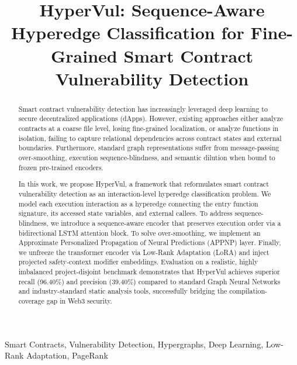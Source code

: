 \documentclass[conference]{IEEEtran}
\begin{document}
\title{HyperVul: Sequence-Aware Hyperedge Classification for Fine-Grained Smart Contract Vulnerability Detection}


\maketitle

\begin{abstract}
Smart contract vulnerability detection has increasingly leveraged deep learning to secure decentralized applications (dApps). However, existing approaches either analyze contracts at a coarse file level, losing fine-grained localization, or analyze functions in isolation, failing to capture relational dependencies across contract states and external boundaries. Furthermore, standard graph representations suffer from message-passing over-smoothing, execution sequence-blindness, and semantic dilution when bound to frozen pre-trained encoders. 

In this work, we propose HyperVul, a framework that reformulates smart contract vulnerability detection as an interaction-level hyperedge classification problem. We model each execution interaction as a hyperedge connecting the entry function signature, its accessed state variables, and external callees. To address sequence-blindness, we introduce a sequence-aware encoder that preserves execution order via a bidirectional LSTM attention block. To solve over-smoothing, we implement an Approximate Personalized Propagation of Neural Predictions (APPNP) layer. Finally, we unfreeze the transformer encoder via Low-Rank Adaptation (LoRA) and inject projected safety-context modifier embeddings. Evaluation on a realistic, highly imbalanced project-disjoint benchmark demonstrates that HyperVul achieves superior recall (96.40\%) and precision (39.40\%) compared to standard Graph Neural Networks and industry-standard static analysis tools, successfully bridging the compilation-coverage gap in Web3 security.
\end{abstract}

\begin{IEEEkeywords}
Smart Contracts, Vulnerability Detection, Hypergraphs, Deep Learning, Low-Rank Adaptation, PageRank
\end{IEEEkeywords}
\end{document}
